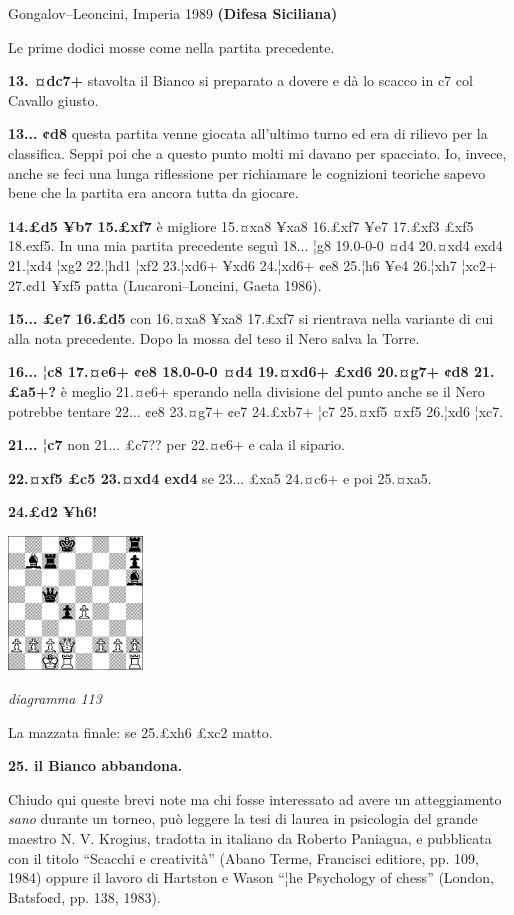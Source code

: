 \documentclass[
]{article}
\begin{document}
Gongalov--Leoncini, Imperia 1989 \textbf{(Difesa Siciliana)}

Le prime dodici mosse come nella partita precedente.

\textbf{13. ¤dc7+} stavolta il Bianco si preparato a dovere e dà lo
scacco in c7 col Cavallo giusto.

\textbf{13... ¢d8} questa partita venne giocata all'ultimo turno ed era
di rilievo per la classifica. Seppi poi che a questo punto molti mi
davano per spacciato. Io, invece, anche se feci una lunga riflessione
per richiamare le cognizioni teoriche sapevo bene che la partita era
ancora tutta da giocare.

\textbf{14.£d5 ¥b7 15.£xf7} è migliore 15.¤xa8 ¥xa8 16.£xf7 ¥e7 17.£xf3
£xf5 18.exf5. In una mia partita precedente seguì 18... ¦g8 19.0-0-0 ¤d4
20.¤xd4 exd4 21.¦xd4 ¦xg2 22.¦hd1 ¦xf2 23.¦xd6+ ¥xd6 24.¦xd6+ ¢e8 25.¦h6
¥e4 26.¦xh7 ¦xc2+ 27.¢d1 ¥xf5 patta (Lucaroni--Loncini, Gaeta 1986).

\textbf{15... £e7 16.£d5} con 16.¤xa8 ¥xa8 17.£xf7 si rientrava nella
variante di cui alla nota precedente. Dopo la mossa del teso il Nero
salva la Torre.

\textbf{16... ¦c8 17.¤e6+ ¢e8 18.0-0-0 ¤d4 19.¤xd6+ £xd6 20.¤g7+ ¢d8
21.£a5+?} è meglio 21.¤e6+ sperando nella divisione del punto anche se
il Nero potrebbe tentare 22... ¢e8 23.¤g7+ ¢e7 24.£xb7+ ¦c7 25.¤xf5 ¤xf5
26.¦xd6 ¦xc7.

\textbf{21... ¦c7} non 21... £c7?? per 22.¤e6+ e cala il sipario.

\textbf{22.¤xf5 £c5 23.¤xd4 exd4} se 23... £xa5 24.¤c6+ e poi 25.¤xa5.

\textbf{24.£d2 ¥h6!}

\includegraphics[width=1.40139in,height=1.40139in]{vertopal_109f12be458a423d8f3cc838880eaea2/media/image113.png}

\emph{diagramma 113}

La mazzata finale: se 25.£xh6 £xc2 matto.

\textbf{25. il Bianco abbandona.}

Chiudo qui queste brevi note ma chi fosse interessato ad avere un
atteggiamento \emph{sano} durante un torneo, può leggere la tesi di
laurea in psicologia del grande maestro N. V. Krogius, tradotta in
italiano da Roberto Paniagua, e pubblicata con il titolo ``Scacchi e
creatività'' (Abano Terme, Francisci editiore, pp. 109, 1984) oppure il
lavoro di Hartston e Wason ``¦he Psychology of chess'' (London,
Batsfo¢d, pp. 138, 1983).
\end{document}
